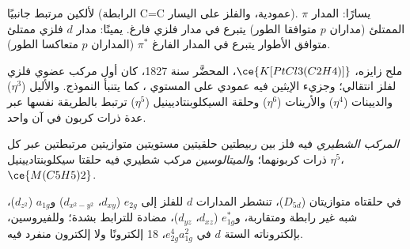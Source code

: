 \begin{omfigure}

{\small {} لألكين مرتبط جانبيًا (الرابطة C=C
عمودية، والفلز على اليسار). يسارًا: المدار $\pi$ الممتلئ (مداران $p$ متوافقا
الطور) يتبرع في مدار فلزي فارغ. يمينًا: مدار $d$ فلزي ممتلئ
متوافق الأطوار يتبرع في المدار الفارغ $\pi^*$ (المداران $p$ متعاكسا
الطور).}
\end{omfigure}

ملح زايزه، $\ce{K[PtCl3(C2H4)]}$، المحضَّر سنة 1827، كان أول مركب عضوي فلزي
لفلز انتقالي؛ وجزيء الإيثين فيه عمودي على المستوي ، كما
يتنبأ النموذج. والأليل ($\eta^3$) والديينات ($\eta^4$) والأرينات ($\eta^6$) وحلقة
السيكلوبنتاديينيل ($\eta^5$) ترتبط بالطريقة نفسها عبر عدة ذرات كربون في آن واحد.

\begin{definition}[الميتالوسينات]\label{def:b3:organometallic-bonding:metallocene}
\emph{المركب الشطيري} فيه فلز بين ربيطتين حلقيتين
مستويتين متوازيتين مرتبطتين عبر كل ذرات كربونهما؛ 
و\emph{الميتالوسين} مركب شطيري فيه حلقتا سيكلوبنتاديينيل $\eta^5$،
$\ce{M(C5H5)2}$.
\end{definition}

\begin{proposition}\label{prop:b3:organometallic-bonding:ferrocene}
في  حلقتاه متوازيتان ($D_{5d}$)، تنشطر المدارات $d$ للفلز إلى $e_{2g}$
($d_{xy}$، $d_{x^2-y^2}$) و$a_{1g}$ ($d_{z^2}$)، شبه غير رابطة ومتقاربة، و$e_{1g}^\ast$ ($d_{xz}$،
$d_{yz}$)، مضادة للترابط بشدة؛ وللفيروسين، بإلكتروناته الستة $d$ في $e_{2g}^4a_{1g}^2$، 18
إلكترونًا ولا إلكترون منفرد فيه.
\end{proposition}


